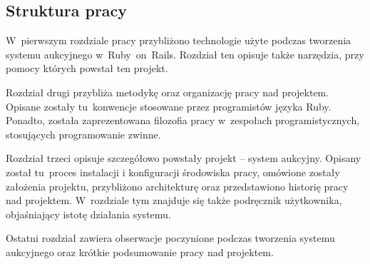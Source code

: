 \subsection*{Struktura pracy}

W~pierwszym rozdziale pracy przybliżono technologie użyte podczas tworzenia systemu aukcyjnego w~Ruby~on~Rails. Rozdział ten opisuje także narzędzia, przy pomocy których powstał ten projekt.


Rozdział drugi przybliża metodykę oraz organizację pracy nad projektem. Opisane zostały tu~konwencje stosowane przez programistów języka Ruby. Ponadto, została zaprezentowana filozofia pracy w~zespołach programistycznych, stosujących programowanie zwinne.


Rozdział trzeci opisuje szczegółowo powstały projekt -- system aukcyjny. Opisany został tu~proces instalacji i konfiguracji środowiska pracy, omówione zostały założenia projektu, przybliżono architekturę oraz przedstawiono historię pracy nad projektem. W~rozdziale tym znajduje się także podręcznik użytkownika, objaśniający istotę działania systemu.


Ostatni rozdział zawiera obserwacje poczynione podczas tworzenia systemu aukcyjnego oraz krótkie podsumowanie pracy nad projektem.
